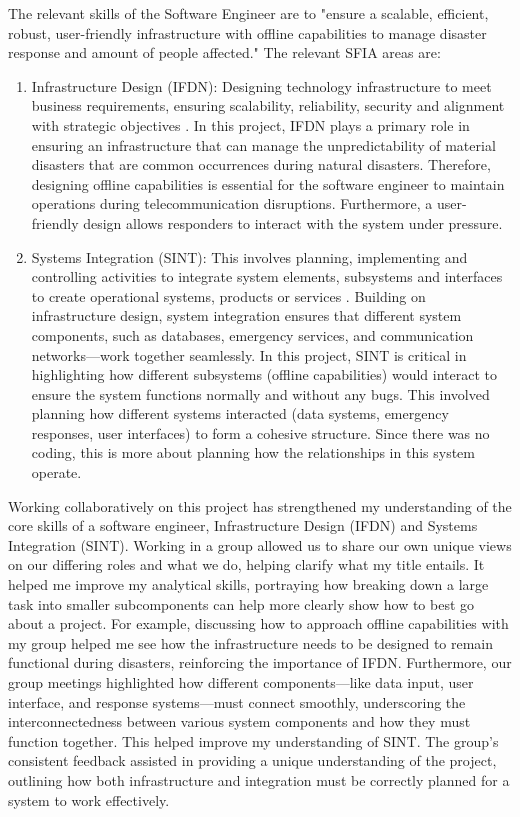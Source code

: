 \documentclass[a4paper, 11pt]{report}
\begin{document}
The relevant skills of the Software Engineer are to "ensure a scalable, efficient, robust, user-friendly infrastructure with offline capabilities to manage disaster response and amount of people affected." The relevant SFIA areas are:
\begin{enumerate}
	\item Infrastructure Design (IFDN): Designing technology infrastructure to meet business requirements, ensuring scalability, reliability, security and alignment with strategic objectives \cite{palma2023}. In this project, IFDN plays a primary role in ensuring an infrastructure that can manage the unpredictability of material disasters that are common occurrences during natural disasters. Therefore, designing offline capabilities is essential for the software engineer to maintain operations during telecommunication disruptions. Furthermore, a user-friendly design allows responders to interact with the system under pressure.
	\item Systems Integration (SINT): This involves planning, implementing and controlling activities to integrate system elements, subsystems and interfaces to create operational systems, products or services \cite{palma2023}. Building on infrastructure design, system integration ensures that different system components, such as databases, emergency services, and communication networks—work together seamlessly. In this project, SINT is critical in highlighting how different subsystems (offline capabilities) would interact to ensure the system functions normally and without any bugs. This involved planning how different systems interacted (data systems, emergency responses, user interfaces) to form a cohesive structure. Since there was no coding, this is more about planning how the relationships in this system operate.
 \end{enumerate}

Working collaboratively on this project has strengthened my understanding of the core skills of a software engineer, Infrastructure Design (IFDN) and Systems Integration (SINT). Working in a group allowed us to share our own unique views on our differing roles and what we do, helping clarify what my title entails. It helped me improve my analytical skills, portraying how breaking down a large task into smaller subcomponents can help more clearly show how to best go about a project. For example, discussing how to approach offline capabilities with my group helped me see how the infrastructure needs to be designed to remain functional during disasters, reinforcing the importance of IFDN. Furthermore, our group meetings highlighted how different components—like data input, user interface, and response systems—must connect smoothly, underscoring the interconnectedness between various system components and how they must function together. This helped improve my understanding of SINT. The group's consistent feedback assisted in providing a unique understanding of the project, outlining how both infrastructure and integration must be correctly planned for a system to work effectively.
\end{document}

